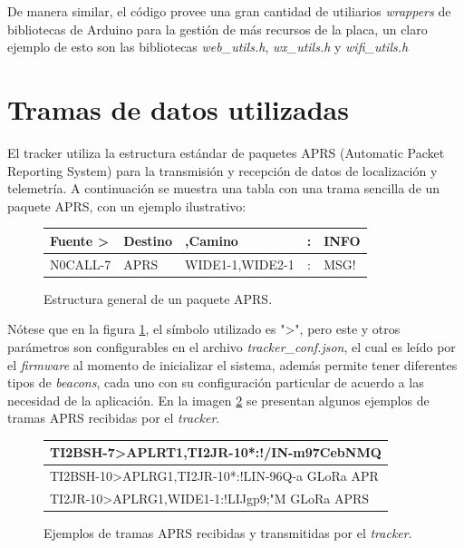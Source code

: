 \documentclass[journal]{IEEEtran}
\begin{document}
De manera similar, el código provee una gran cantidad de utiliarios \textit{wrappers} de bibliotecas de Arduino para la gestión de más recursos de la placa, un claro ejemplo de esto son las bibliotecas \textit{web\_utils.h}, \textit{wx\_utils.h} y \textit{wifi\_utils.h}

\section{Tramas de datos utilizadas}

El tracker utiliza la estructura estándar de paquetes APRS (Automatic Packet Reporting System) para la transmisión y recepción de datos de localización y telemetría. A continuación se muestra una tabla con una trama sencilla de un paquete APRS, con un ejemplo ilustrativo:

\small

\vspace{0.5em}
\begin{figure}[h!]
\begin{tabular}{@{} l l l c l @{}}
\toprule
\textbf{Fuente} \textbf{>}& \textbf{Destino} & \textbf{,}\textbf{Camino} & \textbf{:} & \textbf{INFO}\\
\midrule
N0CALL-7 & APRS & WIDE1-1,WIDE2-1 & : & MSG! \\
\bottomrule
\end{tabular}
\caption{Estructura general de un paquete APRS.}
\label{fig:trama-aprs}
\end{figure}

Nótese que en la figura \ref{fig:trama-aprs}, el símbolo utilizado es ">", pero este y otros parámetros son configurables en el archivo \textit{tracker\_conf.json}, el cual es leído por el \textit{firmware} al momento de inicializar el sistema, además permite tener diferentes tipos de \textit{beacons}, cada uno con su configuración particular de acuerdo a las necesidad de la aplicación.
En la imagen \ref{fig:tramas-ejemplo} se presentan algunos ejemplos de tramas APRS recibidas por el \textit{tracker}.

\begin{figure}[htbp]
\begin{tabular}{|l|}
\hline
TI2BSH-7>APLRT1,TI2JR-10*:!/IN-m97CebNMQ\\
\hline
TI2BSH-10>APLRG1,TI2JR-10*:!LIN-96Q-a  GLoRa APR\\
\hline
TI2JR-10>APLRG1,WIDE1-1:!LIJgp9;"M  GLoRa APRS \\
\hline
\end{tabular}
\caption{Ejemplos de tramas APRS recibidas y transmitidas por el \textit{tracker}.}
\label{fig:tramas-ejemplo}
\end{figure}
\vspace{1cm}
\end{document}
